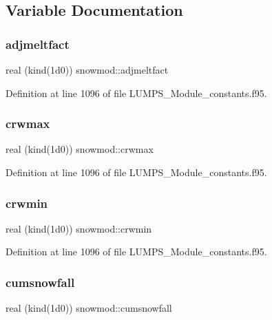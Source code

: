 \subsection{Variable Documentation}
\mbox{\label{namespacesnowmod_a5c337bba47f88549ed03afb42d5d097d}} 
\subsubsection{\texorpdfstring{adjmeltfact}{adjmeltfact}}
{\footnotesize\ttfamily real (kind(1d0)) snowmod\+::adjmeltfact}



Definition at line 1096 of file L\+U\+M\+P\+S\+\_\+\+Module\+\_\+constants.\+f95.

\mbox{\label{namespacesnowmod_adec694ca0cbc2092f2c5d16238b4d0a9}} 
\subsubsection{\texorpdfstring{crwmax}{crwmax}}
{\footnotesize\ttfamily real (kind(1d0)) snowmod\+::crwmax}



Definition at line 1096 of file L\+U\+M\+P\+S\+\_\+\+Module\+\_\+constants.\+f95.

\mbox{\label{namespacesnowmod_ab2e9b89164bc8dd89eadb546e3ef57fa}} 
\subsubsection{\texorpdfstring{crwmin}{crwmin}}
{\footnotesize\ttfamily real (kind(1d0)) snowmod\+::crwmin}



Definition at line 1096 of file L\+U\+M\+P\+S\+\_\+\+Module\+\_\+constants.\+f95.

\mbox{\label{namespacesnowmod_a78e0393f653cfdebf0ccab83abc0b800}} 
\subsubsection{\texorpdfstring{cumsnowfall}{cumsnowfall}}
{\footnotesize\ttfamily real (kind(1d0)) snowmod\+::cumsnowfall}



